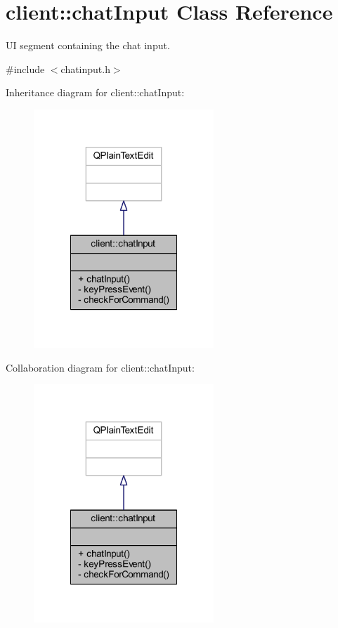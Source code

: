 \hypertarget{classclient_1_1chat_input}{\section{client\-:\-:chat\-Input Class Reference}
\label{d1/d34/classclient_1_1chat_input}
}


U\-I segment containing the chat input.  




{\ttfamily \#include $<$chatinput.\-h$>$}



Inheritance diagram for client\-:\-:chat\-Input\-:\nopagebreak
\begin{figure}[H]
\begin{center}
\leavevmode
\includegraphics[width=192pt]{d3/de6/classclient_1_1chat_input__inherit__graph}
\end{center}
\end{figure}


Collaboration diagram for client\-:\-:chat\-Input\-:\nopagebreak
\begin{figure}[H]
\begin{center}
\leavevmode
\includegraphics[width=192pt]{d2/da1/classclient_1_1chat_input__coll__graph}
\end{center}
\end{figure}
